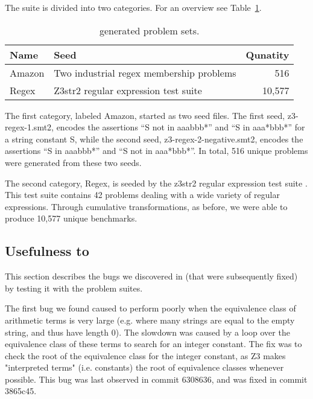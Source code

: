     The suite is divided into two categories. For an overview see Table~\ref{tbl:transformed}.
    
    \begin{table}
    \begin{tabular}{|l|l|r|}
        \hline
        \textbf{Name} & \textbf{Seed}                            & \textbf{Qunatity} \\ \hline
        Amazon        & Two industrial regex membership problems & 516\\ \hline
        Regex         & Z3str2 regular expression test suite     & 10,577\\ \hline
    \end{tabular}
    \caption{\transformer{} generated problem sets.}
    \label{tbl:transformed}
    \end{table}

    The first category, labeled Amazon, started as two seed files.
    The first seed, z3-regex-1.smt2, encodes the assertions ``S not in aaabbb*'' and ``S in aaa*bbb*'' for a string constant S,
    while the second seed, z3-regex-2-negative.smt2, encodes the assertions ``S in aaabbb*'' and ``S not in aaa*bbb*''. 
    In total, 516 unique problems were generated from these two seeds.
    
    The second category, Regex, is seeded by the z3str2 regular expression test suite \cite{} 
    . 
    This test suite contains 42 problems dealing with a wide variety of regular expressions.
    Through cumulative transformations, as before, we were able to produce 10,577 unique benchmarks.


    \subsection{Usefulness to \us{}}

        This section describes the bugs we discovered in \us{} (that were subsequently fixed) by testing it with the \fuzzer{} problem suites.

        The first bug we found caused \us{} to perform poorly when the equivalence class of arithmetic terms is very large (e.g. where many strings are equal to the empty string, and thus have length 0). The slowdown was caused by a loop over the equivalence class of these terms to search for an integer constant. The fix was to check the root of the equivalence class for the integer constant, as Z3 makes "interpreted terms" (i.e. constants) the root of equivalence classes whenever possible. This bug was last observed in commit 6308636, and was fixed in commit 3865c45.

